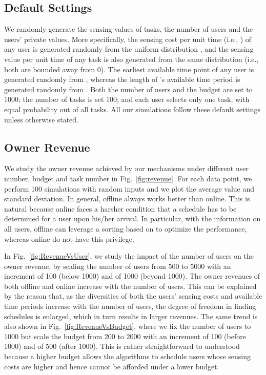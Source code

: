 \documentclass[10pt,journal,compsoc]{IEEEtran}
\begin{document}
  \subsection{Default Settings} \label{sec:simgeneral}
We randomly generate the sensing values of tasks, the number of users and the users' private values. More specifically, the sensing cost per unit time (i.e., ) of any user  is generated randomly from the uniform distribution , and the sensing value per unit time  of any task  is also generated from the same distribution (i.e., both are bounded away from 0). The earliest available time point  of any user  is generated randomly from , whereas the length of 's available time period is generated randomly from . Both the number of users  and the budget  are set to 1000; the number of tasks  is set 100; and each user selects only one task, with equal probability out of all tasks. All our simulations follow these default settings unless otherwise stated.

  \subsection{Owner Revenue}
We study the owner revenue achieved by our mechanisms under different user number, budget and task number in Fig.~\ref{fig:revenue}. For each data point, we perform 100 simulations with random inputs and we plot the average value and standard deviation. In general, \textsf{offline} always works better than \textsf{online}. This is natural because \textsf{online} faces a harsher condition that a schedule has to be determined for a user upon his/her arrival. In particular, with the information on all users, \textsf{offline} can leverage a sorting based on  to optimize the performance, whereas \textsf{online} do not have this privilege.

    In Fig.~\ref{fig:RevenueVsUser}, we study the impact of the number of users on the owner revenue, by scaling the number of users from 500 to 5000 with an increment of 100 (below 1000) and of 1000 (beyond 1000). The owner revenues of both \textsf{offline} and \textsf{online} increase with the number of users. This can be explained by the reason that, as the diversities of both the users' sensing costs and available time periods increase with the number of users, the degree of freedom in finding schedules is enlarged, which in turn results in larger revenues. The same trend is also shown in Fig.~\ref{fig:RevenueVsBudget}, where we fix the number of users to 1000 but scale the budget  from 200 to 2000 with an increment of 100 (before 1000) and of 500 (after 1000). This is rather straightforward to understood because a higher budget allows the algorithms to schedule users whose sensing costs are higher and hence cannot be afforded under a lower budget.
\end{document}
